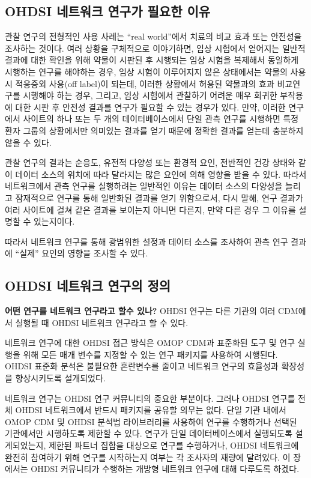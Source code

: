 \documentclass[11pt]{book}
\theoremstyle{definition}
\theoremstyle{definition}
\theoremstyle{definition}
\theoremstyle{remark}
\let\BeginKnitrBlock\begin \let\EndKnitrBlock\end
\begin{document}
\subsection{OHDSI 네트워크 연구가 필요한 이유}\label{ohdsi----}

관찰 연구의 전형적인 사용 사례는 ``real world''에서 치료의 비교 효과
또는 안전성을 조사하는 것이다. 여러 상황을 구체적으로 이야기하면, 임상
시험에서 얻어지는 일반적 결과에 대한 확인을 위해 약물이 시판된 후
시행되는 임상 시험을 복제해서 동일하게 시행하는 연구를 해야하는 경우,
임상 시험이 이루어지지 않은 상태에서는 약물의 사용시 적응증외 사용(off
label)이 되는데, 이러한 상황에서 허용된 약물과의 효과 비교연구를
시행해야 하는 경우, 그리고, 임상 시험에서 관찰하기 어려운 매우 희귀한
부작용에 대한 시판 후 안전성 결과를 연구가 필요할 수 있는 경우가 있다.
만약, 이러한 연구에서 사이트의 하나 또는 두 개의 데이터베이스에서 단일
관측 연구를 시행하면 특정 환자 그룹의 상황에서만 의미있는 결과를 얻기
때문에 정확한 결과를 얻는데 충분하지 않을 수 있다.

관찰 연구의 결과는 순응도, 유전적 다양성 또는 환경적 요인, 전반적인 건강
상태와 같이 데이터 소스의 위치에 따라 달라지는 많은 요인에 의해 영향을
받을 수 있다. 따라서 네트워크에서 관측 연구를 실행하려는 일반적인 이유는
데이터 소스의 다양성을 늘리고 잠재적으로 연구를 통해 일반화된 결과를
얻기 위함으로서, 다시 말해, 연구 결과가 여러 사이트에 걸쳐 같은 결과를
보이는지 아니면 다른지, 만약 다른 경우 그 이유를 설명할 수 있는지이다.

따라서 네트워크 연구를 통해 광범위한 설정과 데이터 소스를 조사하여 관측
연구 결과에 ``실제'' 요인의 영향을 조사할 수 있다.

\subsection{OHDSI 네트워크 연구의 정의}\label{ohdsi---}

\BeginKnitrBlock{rmdimportant}
\textbf{어떤 연구를 네트워크 연구라고 할수 있나?} OHDSI 연구는 다른
기관의 여러 CDM에서 실행될 때 OHDSI 네트워크 연구라고 할 수 있다.
\EndKnitrBlock{rmdimportant}

네트워크 연구에 대한 OHDSI 접근 방식은 OMOP CDM과 표준화된 도구 및 연구
실행을 위해 모든 매개 변수를 지정할 수 있는 연구 패키지를 사용하여
시행된다. OHDSI 표준화 분석은 불필요한 혼란변수를 줄이고 네트워크 연구의
효율성과 확장성을 향상시키도록 설개되었다.

네트워크 연구는 OHDSI 연구 커뮤니티의 중요한 부분이다. 그러나 OHDSI
연구를 전체 OHDSI 네트워크에서 반드시 패키지를 공유할 의무는 없다. 단일
기관 내에서 OMOP CDM 및 OHDSI 분석법 라이브러리를 사용하여 연구를
수행하거나 선택된 기관에서만 시행하도록 제한할 수 있다. 연구가 단일
데이터베이스에서 실행되도록 설계되었는지, 제한된 파트너 집합을 대상으로
연구를 수행하거나, OHDSI 네트워크에 완전히 참여하기 위해 연구를
시작하는지 여부는 각 조사자의 재량에 달려있다. 이 장에서는 OHDSI
커뮤니티가 수행하는 개방형 네트워크 연구에 대해 다루도록 하겠다.
\end{document}
